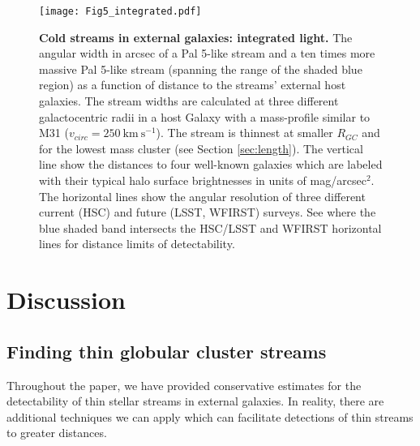 \documentclass[twocolumn]{aastex62}
\newcommand{\kms}{\ensuremath{\textrm{km}~\textrm{s}^{-1}}}
\begin{document}
\begin{figure}
\centerline{\texttt{[image: Fig5\_integrated.pdf]}}
\caption{{\bf Cold streams in external galaxies: integrated light.} The angular width in arcsec of a Pal 5-like stream and a ten times more massive Pal 5-like stream (spanning the range of the shaded blue region) as a function of distance to the streams' external host galaxies. The stream widths are calculated at three different galactocentric radii in a host Galaxy with a mass-profile similar to M31 ($v_{circ} = 250 ~\kms$). The stream is thinnest at smaller $R_{GC}$ and for the lowest mass cluster (see Section \ref{sec:length}). The vertical line show the distances to four well-known galaxies which are labeled with their typical halo surface brightnesses in units of mag/arcsec$^2$. The horizontal lines show the angular resolution of three different current (HSC) and future (LSST, WFIRST) surveys. See where the blue shaded band intersects the HSC/LSST and WFIRST horizontal lines for distance limits of detectability.} %
\label{fig:int}
\end{figure}


\section{Discussion}
\label{sec:discussion}

\subsection{Finding thin globular cluster streams}
\label{sec:color}
Throughout the paper, we have provided conservative estimates for the detectability of thin stellar streams in external galaxies. In reality, there are additional techniques we can apply which can facilitate detections of thin streams to greater distances. 
\end{document}
